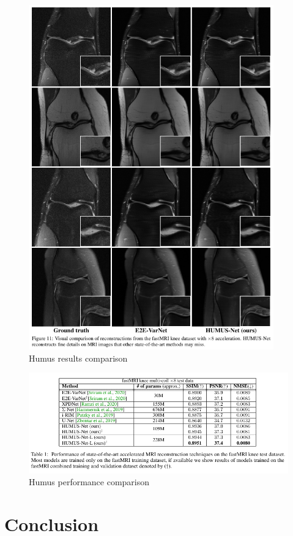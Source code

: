 \documentclass[10pt,a4paper]{article}
\begin{document}
\begin{figure}[H]
\centering
\includegraphics[width=300pt]{./images/humus-comparison.png}
\caption{Humus results comparison \cite{fabian2023humusnet}}
\end{figure}

\begin{figure}[H]
\centering
\includegraphics[width=400pt]{./images/humus-perf.png}
\caption{Humus performance comparison \cite{fabian2023humusnet}}
\end{figure}

\section{Conclusion}
\end{document}
